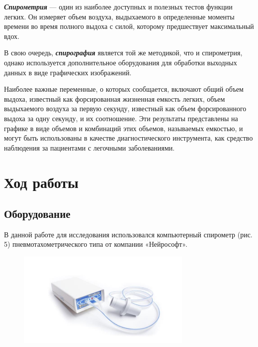 \documentclass{article}
\begin{document}
            \hspace*{4mm} \textbf{\textit{Спирометрия}} — один из наиболее доступных и полезных тестов функции
            легких. Он измеряет объем воздуха, выдыхаемого в определенные моменты
            времени во время полного выдоха с силой, которому предшествует
            максимальный вдох.
            \vspace*{4mm}

            В свою очередь, \textbf{\textit{спирография}} является той же методикой, что и
            спирометрия, однако используется дополнительное оборудования для обработки
            выходных данных в виде графических изображений.
            \vspace*{4mm}

            Наиболее важные переменные, о которых сообщается, включают общий
            объем выдоха, известный как форсированная жизненная емкость легких, объем
            выдыхаемого воздуха за первую секунду, известный как объем форсированного
            выдоха за одну секунду, и их соотношение. Эти результаты представлены на
            графике в виде объемов и комбинаций этих объемов, называемых емкостью, и
            могут быть использованы в качестве диагностического инструмента, как
            средство наблюдения за пациентами с легочными заболеваниями.


    \section*{Ход работы}

        \subsection*{Оборудование}

            \hspace*{4mm} В данной работе для исследования использовался компьютерный
            спирометр (рис. 5) пневмотахометрического типа от компании «Нейрософт».

            \begin{figure}[h]
                \centering
                \includegraphics*[width=0.75\textwidth]{Спирометр.png}
            \end{figure}
        \newpage
\end{document}
